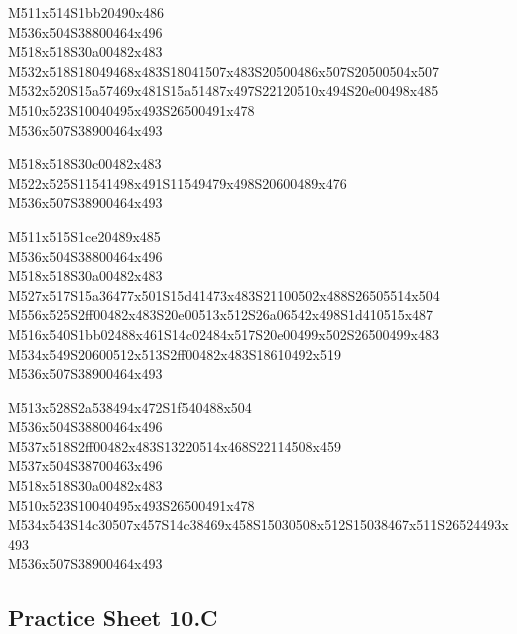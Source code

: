 \documentclass{article}
\begin{document}
\begin{multicols}{5}
\begin{center}
M511x514S1bb20490x486 %
\\M536x504S38800464x496 %
\\M518x518S30a00482x483 %
\\M532x518S18049468x483S18041507x483S20500486x507S20500504x507 %
\\M532x520S15a57469x481S15a51487x497S22120510x494S20e00498x485 %
\\M510x523S10040495x493S26500491x478 %
\\M536x507S38900464x493 %

M518x518S30c00482x483 %
\\M522x525S11541498x491S11549479x498S20600489x476 %
\\M536x507S38900464x493 %
\vfil
\columnbreak

M511x515S1ce20489x485 %
\\M536x504S38800464x496 %
\\M518x518S30a00482x483 %
\\M527x517S15a36477x501S15d41473x483S21100502x488S26505514x504 %
\\M556x525S2ff00482x483S20e00513x512S26a06542x498S1d410515x487 %
\\M516x540S1bb02488x461S14c02484x517S20e00499x502S26500499x483 %
\\M534x549S20600512x513S2ff00482x483S18610492x519 %
\\M536x507S38900464x493 %
\vfil
\columnbreak

M513x528S2a538494x472S1f540488x504 %
\\M536x504S38800464x496 %
\\M537x518S2ff00482x483S13220514x468S22114508x459 %
\\M537x504S38700463x496 %
\\M518x518S30a00482x483 %
\\M510x523S10040495x493S26500491x478 %
\\M534x543S14c30507x457S14c38469x458S15030508x512S15038467x511S26524493x493 %
\\M536x507S38900464x493 %
\vfil

\end{center}
\end{multicols}

\subsection{Practice Sheet 10.C}
\end{document}
